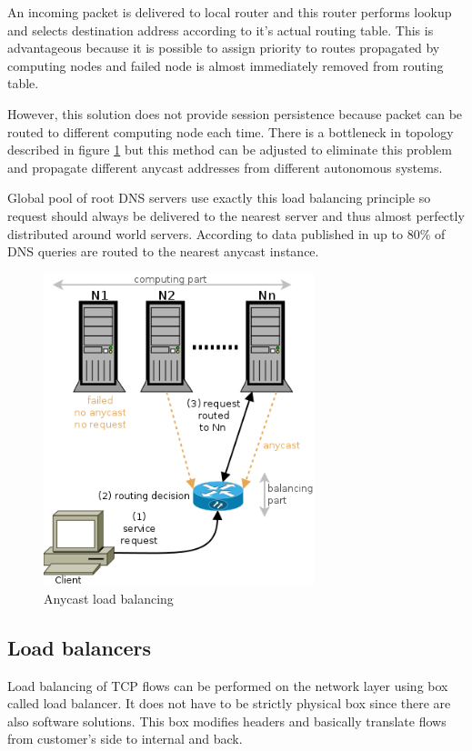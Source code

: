 An incoming packet is delivered to local router and this router performs lookup and selects destination address according to it's actual routing table. This is advantageous because it is possible to assign priority to routes propagated by computing nodes and failed node is almost immediately removed from routing table.

However, this solution does not provide session persistence because packet can be routed to different computing node each time. There is a bottleneck in topology described in figure \ref{img:anycast-balancing} but this method can be adjusted to eliminate this problem and propagate different anycast addresses from different autonomous systems.

Global pool of root \Ac{DNS} servers use exactly this load balancing principle so request should always be delivered to the nearest server and thus almost perfectly distributed around world servers. According to data published in \cite{dns-anycast} up to 80\% of \Ac{DNS} queries are routed to the nearest anycast instance.

\begin{figure}[htb]
	\begin{center}
	\includegraphics[width=0.7\textwidth]{balancing-anycast.png}
	\end{center}
	\caption{Anycast load balancing}
	\label{img:anycast-balancing}
\end{figure}

\subsection{Load balancers}
Load balancing of \Ac{TCP} flows can be performed on the network layer using box called load balancer. It does not have to be strictly physical box since there are also software solutions. This box modifies headers and basically translate flows from customer's side to internal and back. 

